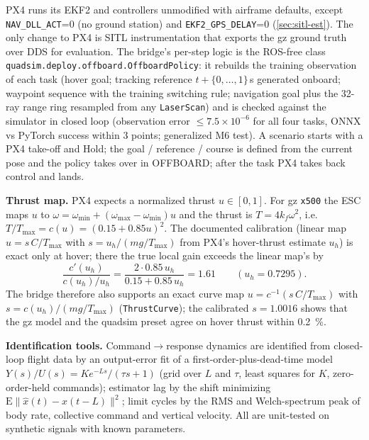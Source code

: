 PX4 runs its EKF2 and controllers unmodified with airframe defaults, except \texttt{NAV\_DLL\_ACT}=0 (no ground
station) and \texttt{EKF2\_GPS\_DELAY}=0 (\cref{sec:sitl-est}). The only change to PX4 is SITL instrumentation that
exports the gz ground truth over DDS for evaluation. The bridge's per-step logic is the ROS-free class
\texttt{quadsim.deploy.offboard.OffboardPolicy}: it rebuilds the training observation of each task (hover goal; tracking
reference $t+\{0,\dots,1\}$\,s generated onboard; waypoint sequence with the training switching rule; navigation goal plus
the 32-ray range ring resampled from any \texttt{LaserScan}) and is checked against the simulator in closed loop
(observation error $\le7.5\times10^{-6}$ for all four tasks, ONNX vs PyTorch success within 3 points; generalized M6
test). A scenario starts with a PX4 take-off and Hold; the goal / reference / course is defined from the current pose and
the policy takes over in OFFBOARD; after the task PX4 takes back control and lands.

\textbf{Thrust map.} PX4 expects a normalized thrust $u\in[0,1]$. For gz \texttt{x500} the ESC maps $u$ to
$\omega=\omega_{\min}+(\omega_{\max}-\omega_{\min})u$ and the thrust is $T=4k_f\omega^2$, i.e.\ $T/T_{\max}=c(u)=(0.15+0.85u)^2$.
The documented calibration (linear map $u=s\,C/T_{\max}$ with $s=u_h/(mg/T_{\max})$ from PX4's hover-thrust estimate $u_h$)
is exact only at hover; there the true local gain exceeds the linear map's by
\begin{equation}
\frac{c'(u_h)}{c(u_h)/u_h}=\frac{2\cdot0.85\,u_h}{0.15+0.85\,u_h}=1.61\qquad(u_h=0.7295).
\end{equation}
The bridge therefore also supports an
exact curve map $u=c^{-1}(s\,C/T_{\max})$ with $s=c(u_h)/(mg/T_{\max})$ (\texttt{ThrustCurve}); the calibrated
$s=1.0016$ shows that the gz model and the quadsim preset agree on hover thrust within \SI{0.2}{\percent}.

\textbf{Identification tools.} Command$\to$response dynamics are identified from closed-loop flight data by an output-error
fit of a first-order-plus-dead-time model $Y(s)/U(s)=Ke^{-Ls}/(\tau s+1)$ (grid over $L$ and $\tau$, least squares for $K$,
zero-order-held commands); estimator lag by the shift minimizing $\mathrm{E}\|\hat x(t)-x(t-L)\|^2$; limit cycles by the
RMS and Welch-spectrum peak of body rate, collective command and vertical velocity. All are unit-tested on synthetic
signals with known parameters.


